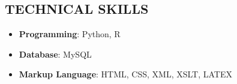 \documentclass[margin, 10pt]{res} %
\begin{document}
\begin{resume}
\section{TECHNICAL SKILLS}
\begin{itemize}
\item \textbf{Programming}: Python, R
\item \textbf{Database}: MySQL
\item \textbf{Markup Language}: HTML, CSS, XML, XSLT, LATEX
\end{itemize}



\end{resume}
\end{document}
